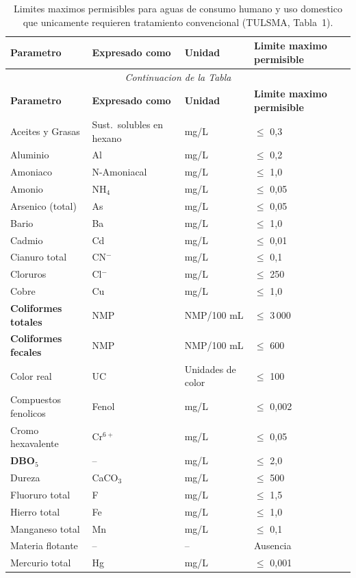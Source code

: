 \documentclass[12pt,a4paper]{article}
\begin{document}
\begin{longtable}{p{4.5cm}p{2.0cm}p{2.0cm}p{3.5cm}}
\caption{Limites maximos permisibles para aguas de consumo humano y uso domestico que unicamente requieren tratamiento convencional (TULSMA, Tabla~1).}\\
\toprule
\textbf{Parametro} & \textbf{Expresado como} & \textbf{Unidad} & \textbf{Limite maximo permisible} \\
\midrule
\endfirsthead
\multicolumn{4}{c}{\small\itshape Continuacion de la Tabla}\\
\toprule
\textbf{Parametro} & \textbf{Expresado como} & \textbf{Unidad} & \textbf{Limite maximo permisible} \\
\midrule
\endhead
\bottomrule
\endlastfoot
Aceites y Grasas & Sust.\ solubles en hexano & mg/L & $\leq$ 0,3 \\
Aluminio & Al & mg/L & $\leq$ 0,2 \\
Amoniaco & N-Amoniacal & mg/L & $\leq$ 1,0 \\
Amonio & NH$_4$ & mg/L & $\leq$ 0,05 \\
Arsenico (total) & As & mg/L & $\leq$ 0,05 \\
Bario & Ba & mg/L & $\leq$ 1,0 \\
Cadmio & Cd & mg/L & $\leq$ 0,01 \\
Cianuro total & CN$^-$ & mg/L & $\leq$ 0,1 \\
Cloruros & Cl$^-$ & mg/L & $\leq$ 250 \\
Cobre & Cu & mg/L & $\leq$ 1,0 \\
\textbf{Coliformes totales} & NMP & NMP/100 mL & $\leq$ 3\,000 \\
\textbf{Coliformes fecales} & NMP & NMP/100 mL & $\leq$ 600 \\
Color real & UC & Unidades de color & $\leq$ 100 \\
Compuestos fenolicos & Fenol & mg/L & $\leq$ 0,002 \\
Cromo hexavalente & Cr$^{6+}$ & mg/L & $\leq$ 0,05 \\
\textbf{DBO$_5$} & -- & mg/L & $\leq$ 2,0 \\
Dureza & CaCO$_3$ & mg/L & $\leq$ 500 \\
Fluoruro total & F & mg/L & $\leq$ 1,5 \\
Hierro total & Fe & mg/L & $\leq$ 1,0 \\
Manganeso total & Mn & mg/L & $\leq$ 0,1 \\
Materia flotante & -- & -- & Ausencia \\
Mercurio total & Hg & mg/L & $\leq$ 0,001 \\

\end{longtable}
\end{document}
